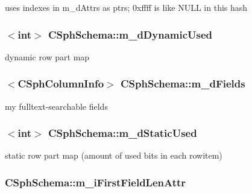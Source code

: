 uses indexes in m\-\_\-d\-Attrs as ptrs; 0xffff is like N\-U\-L\-L in this hash 

\hypertarget{classCSphSchema_abc2a31434964af188a792a209c5da8c3}{
\subsubsection[{m\-\_\-d\-Dynamic\-Used}]{$<${\bf int}$>$ C\-Sph\-Schema\-::m\-\_\-d\-Dynamic\-Used}}\label{classCSphSchema_abc2a31434964af188a792a209c5da8c3}


dynamic row part map 

\hypertarget{classCSphSchema_a5bc8bc08c16e65a336cf3a90e721de73}{
\subsubsection[{m\-\_\-d\-Fields}]{$<${\bf C\-Sph\-Column\-Info}$>$ C\-Sph\-Schema\-::m\-\_\-d\-Fields}}\label{classCSphSchema_a5bc8bc08c16e65a336cf3a90e721de73}


my fulltext-\/searchable fields 

\hypertarget{classCSphSchema_a320ab896c9b8e29a71a91d2eff830773}{
\subsubsection[{m\-\_\-d\-Static\-Used}]{$<${\bf int}$>$ C\-Sph\-Schema\-::m\-\_\-d\-Static\-Used}}\label{classCSphSchema_a320ab896c9b8e29a71a91d2eff830773}


static row part map (amount of used bits in each rowitem) 

\hypertarget{classCSphSchema_a51e341999cdda7154b60b536ff09bd15}{
\subsubsection[{m\-\_\-i\-First\-Field\-Len\-Attr}]{ C\-Sph\-Schema\-::m\-\_\-i\-First\-Field\-Len\-Attr\hspace{0.3cm}{\ttfamily [protected]}}}\label{classCSphSchema_a51e341999cdda7154b60b536ff09bd15}


